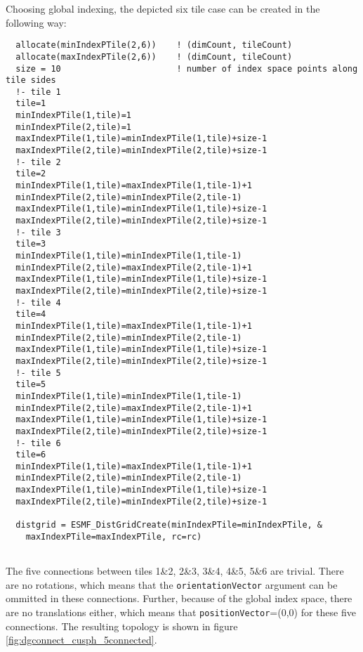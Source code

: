   Choosing global indexing, the depicted six tile case can be created
   in the following way: 

 \begin{verbatim}
  allocate(minIndexPTile(2,6))    ! (dimCount, tileCount)
  allocate(maxIndexPTile(2,6))    ! (dimCount, tileCount)
  size = 10                       ! number of index space points along tile sides
  !- tile 1
  tile=1
  minIndexPTile(1,tile)=1
  minIndexPTile(2,tile)=1
  maxIndexPTile(1,tile)=minIndexPTile(1,tile)+size-1
  maxIndexPTile(2,tile)=minIndexPTile(2,tile)+size-1
  !- tile 2
  tile=2
  minIndexPTile(1,tile)=maxIndexPTile(1,tile-1)+1
  minIndexPTile(2,tile)=minIndexPTile(2,tile-1)
  maxIndexPTile(1,tile)=minIndexPTile(1,tile)+size-1
  maxIndexPTile(2,tile)=minIndexPTile(2,tile)+size-1
  !- tile 3
  tile=3
  minIndexPTile(1,tile)=minIndexPTile(1,tile-1)
  minIndexPTile(2,tile)=maxIndexPTile(2,tile-1)+1
  maxIndexPTile(1,tile)=minIndexPTile(1,tile)+size-1
  maxIndexPTile(2,tile)=minIndexPTile(2,tile)+size-1
  !- tile 4
  tile=4
  minIndexPTile(1,tile)=maxIndexPTile(1,tile-1)+1
  minIndexPTile(2,tile)=minIndexPTile(2,tile-1)
  maxIndexPTile(1,tile)=minIndexPTile(1,tile)+size-1
  maxIndexPTile(2,tile)=minIndexPTile(2,tile)+size-1
  !- tile 5
  tile=5
  minIndexPTile(1,tile)=minIndexPTile(1,tile-1)
  minIndexPTile(2,tile)=maxIndexPTile(2,tile-1)+1
  maxIndexPTile(1,tile)=minIndexPTile(1,tile)+size-1
  maxIndexPTile(2,tile)=minIndexPTile(2,tile)+size-1
  !- tile 6
  tile=6
  minIndexPTile(1,tile)=maxIndexPTile(1,tile-1)+1
  minIndexPTile(2,tile)=minIndexPTile(2,tile-1)
  maxIndexPTile(1,tile)=minIndexPTile(1,tile)+size-1
  maxIndexPTile(2,tile)=minIndexPTile(2,tile)+size-1
  
  distgrid = ESMF_DistGridCreate(minIndexPTile=minIndexPTile, &
    maxIndexPTile=maxIndexPTile, rc=rc)
 
\end{verbatim}
 

   
   The five connections between tiles 1\&2, 2\&3, 3\&4, 4\&5, 5\&6 are trivial.
   There are no rotations, which means that the {\tt orientationVector} argument
   can be ommitted in these connections. Further, because of the global index 
   space, there are no translations either, which means that 
   {\tt positionVector}=(0,0) for these five connections. The resulting
   topology is shown in figure \ref{fig:dgconnect_cusph_5connected}. 

